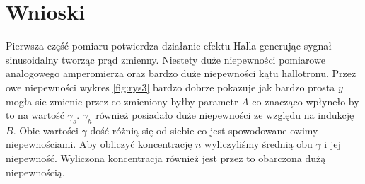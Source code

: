 \documentclass{article}
\begin{document}
\section{Wnioski}
Pierwsza część pomiaru potwierdza działanie efektu Halla generując sygnał sinusoidalny tworząc prąd zmienny. Niestety duże niepewności pomiarowe analogowego amperomierza oraz bardzo duże niepewności kątu hallotronu. Przez owe niepewności wykres \ref{fig:rys3} bardzo dobrze pokazuje jak bardzo prosta $y$ mogła sie zmienic przez co zmieniony byłby parametr $A$ co znacząco wpłyneło by to na wartość $\gamma_{s}$. $\gamma_{h}$ również posiadało duże niepewności ze względu na indukcję $B$. Obie wartości $\gamma$ dość różnią się od siebie co jest spowodowane owimy niepewnościami. Aby obliczyć koncentrację $n$ wyliczyliśmy średnią obu $\gamma$ i jej niepewność. Wyliczona koncentracja również jest przez to obarczona dużą niepewnością.
\end{document}
